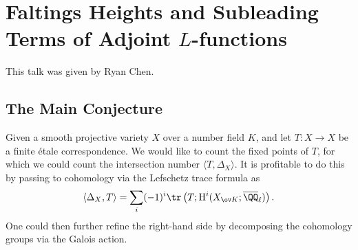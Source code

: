 \documentclass{article}
\begin{document}
\section{Faltings Heights and Subleading Terms of Adjoint \texorpdfstring{$L$}{ L}-functions}
This talk was given by Ryan Chen.

\subsection{The Main Conjecture}
Given a smooth projective variety $X$ over a number field $K$, and let $T\colon X\to X$ be a finite \'etale correspondence. We would like to count the fixed points of $T$, for which we could count the intersection number $\langle T,\Delta_X\rangle$. It is profitable to do this by passing to cohomology via the Lefschetz trace formula as
\[\langle\Delta_X,T\rangle=\sum_i(-1)^i\tr\left(T;\mathrm H^i(X_{\ov K};\overline\QQ_\ell)\right).\]
One could then further refine the right-hand side by decomposing the cohomology groups via the Galois action.
\end{document}
